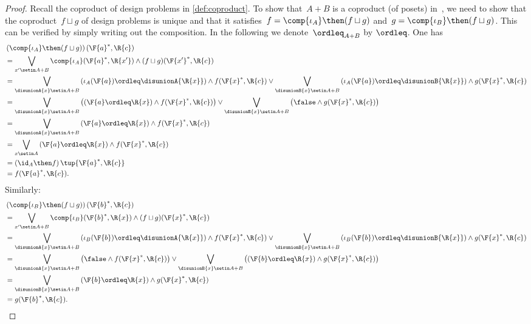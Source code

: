 \begin{proof}
    Recall the coproduct of design problems in \cref{def:coproduct}.
    To show that~$A+B$ is a coproduct (of posets) in~\DP, we need to show that the coproduct~$f \sqcup g$ of design problems is unique and that it satisfies~$f = \comp{\iota_A} \then (f \sqcup g)$ and~$g = \comp{\iota_B} \then (f \sqcup g)$.
    This can be verified by simply writing out the composition.
    In the following we denote~$\ordleq_{A+B}$ by $\ordleq$.
    One has
    \begin{equation}
        \begin{aligned}
             & \left(\comp{\iota_A}\then (f\sqcup g)\right)(\F{a}^*,\R{c}) \\&=\bigvee_{x' \setin A+B}\comp{\iota_A}(\F{a}^*,\R{x'})\wedge (f\sqcup g)(\F{x'}^*,\R{c})\\
             & =\bigvee_{\disunionA{x} \setin A+B}
            \left(\iota_A(\F{a})\ordleq\disunionA{\R{x}}\right)\wedge  f(\F{x}^*,\R{c})  \vee \bigvee_{\disunionB{x} \setin A+B}
            \left(\iota_A(\F{a})\ordleq \disunionB{\R{x}}\right)\wedge  g(\F{x}^*,\R{c}) \\
             & =\bigvee_{\disunionA{x} \setin A+B}
            \left( \left(\F{a}\ordleq \R{x}\right) \wedge  f(\F{x}^*,\R{c})\right) \vee \bigvee_{\disunionB{x} \setin A+B}
            \left( \false \wedge  g(\F{x}^*,\R{c}) \right) \\
             & =\bigvee_{\disunionA{x} \setin A+B} \left(\F{a}\ordleq \R{x}\right) \wedge  f(\F{x}^*,\R{c}) \\
             & =\bigvee_{x\setin A}\left( \F{a}\ordleq \R{x}\right) \wedge f(\F{x}^*,\R{c}) \\
             & =\left( \id_A \then f\right)\tup{\F{a}^*,\R{c}} \\
             & =f(\F{a}^*,\R{c}).
        \end{aligned}
    \end{equation}
    Similarly:
    \begin{equation}
        \begin{aligned}
             & \left(\comp{\iota_B}\then (f\sqcup g)\right)(\F{b}^*,\R{c}) \\&=\bigvee_{x' \setin A+B}\comp{\iota_B}(\F{b}^*,\R{x})\wedge (f\sqcup g)(\F{x}^*,\R{c})\\
             & =\bigvee_{\disunionA{x} \setin A+B}
            \left(\iota_B(\F{b})\ordleq\disunionA{\R{x}}\right)\wedge  f(\F{x}^*,\R{c})  \vee \bigvee_{\disunionB{x} \setin A+B}
            \left(\iota_B(\F{b})\ordleq \disunionB{\R{x}}\right)\wedge  g(\F{x}^*,\R{c}) \\
             & =\bigvee_{\disunionA{x} \setin A+B}
            \left(\false \wedge  f(\F{x}^*,\R{c})\right) \vee \bigvee_{\disunionB{x} \setin A+B}
            \left(\left(\F{b}\ordleq \R{x}\right) \wedge  g(\F{x}^*,\R{c}) \right) \\
             & =\bigvee_{\disunionB{x} \setin A+B} \left(\F{b}\ordleq \R{x}\right) \wedge  g(\F{x}^*,\R{c}) \\
             & =g(\F{b}^*,\R{c}).
        \end{aligned}
    \end{equation}


\end{proof}
